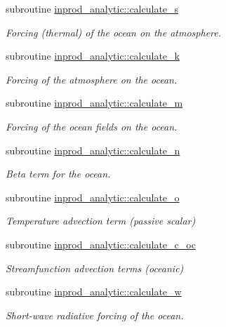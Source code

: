 \begin{DoxyCompactItemize}
subroutine \hyperlink{namespaceinprod__analytic_af2f7504623cdd4e4e6b4b977126475ea}{inprod\+\_\+analytic\+::calculate\+\_\+s}
\begin{DoxyCompactList}\small\item\em Forcing (thermal) of the ocean on the atmosphere. \end{DoxyCompactList}\item 
subroutine \hyperlink{namespaceinprod__analytic_acb883b9fbefbca46b83b384ee74ed703}{inprod\+\_\+analytic\+::calculate\+\_\+k}
\begin{DoxyCompactList}\small\item\em Forcing of the atmosphere on the ocean. \end{DoxyCompactList}\item 
subroutine \hyperlink{namespaceinprod__analytic_ad89fa4b40a4f55e72942f09427d2bafd}{inprod\+\_\+analytic\+::calculate\+\_\+m}
\begin{DoxyCompactList}\small\item\em Forcing of the ocean fields on the ocean. \end{DoxyCompactList}\item 
subroutine \hyperlink{namespaceinprod__analytic_a76eeb8a6a44af38e397edd7e0617afca}{inprod\+\_\+analytic\+::calculate\+\_\+n}
\begin{DoxyCompactList}\small\item\em Beta term for the ocean. \end{DoxyCompactList}\item 
subroutine \hyperlink{namespaceinprod__analytic_a8b820fd46bfdc62c6ae712d4cbfd072f}{inprod\+\_\+analytic\+::calculate\+\_\+o}
\begin{DoxyCompactList}\small\item\em Temperature advection term (passive scalar) \end{DoxyCompactList}\item 
subroutine \hyperlink{namespaceinprod__analytic_aa45dedb07b415eb4cbdb908268c00aa9}{inprod\+\_\+analytic\+::calculate\+\_\+c\+\_\+oc}
\begin{DoxyCompactList}\small\item\em Streamfunction advection terms (oceanic) \end{DoxyCompactList}\item 
subroutine \hyperlink{namespaceinprod__analytic_ad275ee27fa04491805aa7a648183a754}{inprod\+\_\+analytic\+::calculate\+\_\+w}
\begin{DoxyCompactList}\small\item\em Short-\/wave radiative forcing of the ocean. \end{DoxyCompactList}\item 

\end{DoxyCompactItemize}

